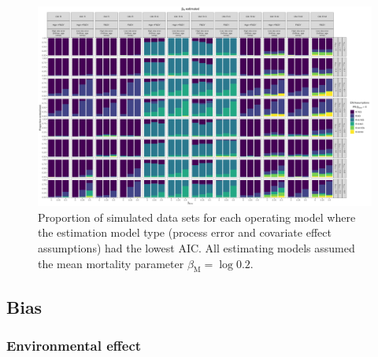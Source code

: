 \documentclass[
  12pt,
]{article}
\begin{document}
\begin{landscape}
\begin{figure}
\caption{Proportion of simulated data sets for each operating model where the estimation model type (process error and covariate effect assumptions) had the lowest AIC. All estimating models assumed the mean mortality parameter $\beta_\text{M} = \log 0.2$.}\label{aic_rank_M_estimated}
\begin{center}
\includegraphics[height = \textheight]{proportion_best_AIC_M_estimated.png}
\end{center}
\end{figure}
\end{landscape}

\hypertarget{bias-1}{%
\subsection*{Bias}\label{bias-1}}

\hypertarget{environmental-effect}{%
\subsubsection*{Environmental effect}\label{environmental-effect}}
\end{document}
